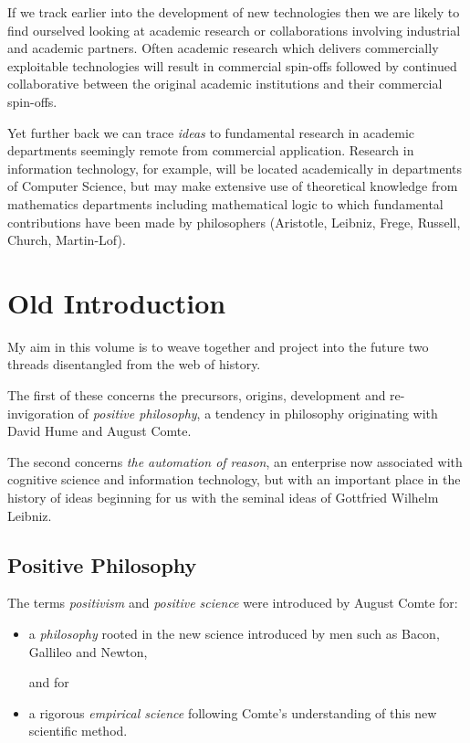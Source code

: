 {If we track earlier into the development of new technologies then we are likely to find ourselved looking at academic research or collaborations involving industrial and academic partners.
Often academic research which delivers commercially exploitable technologies will result in commercial spin-offs followed by continued collaborative between the original academic institutions and their commercial spin-offs.

Yet further back we can trace {\it ideas} to fundamental research in academic departments seemingly remote from commercial application.
Research in information technology, for example, will be located academically in departments of Computer Science, but may make extensive use of theoretical knowledge from mathematics departments including mathematical logic to which fundamental contributions have been made by philosophers (Aristotle, Leibniz, Frege, Russell, Church, Martin-Lof).

}%



\chapter{Old Introduction}\label{Old Introduction}

My aim in this volume is to weave together and project into the future two threads disentangled from the web of history.

The first of these concerns the precursors, origins, development and re-invigoration of {\it positive philosophy},
a tendency in philosophy originating with David Hume and August Comte.

The second concerns {\it the automation of reason}, an enterprise now associated with cognitive science
and information technology, but with an important place in the history of ideas beginning for us
with the seminal ideas of Gottfried Wilhelm Leibniz.

\section{Positive Philosophy}

The terms {\it positivism} and {\it positive science} were introduced by August Comte for:
\begin{itemize}
\item a {\it philosophy} rooted in the new science introduced by men such as Bacon, Gallileo and Newton,

and for
\item a rigorous {\it empirical science} following Comte's understanding of this new scientific method.
\end{itemize}

